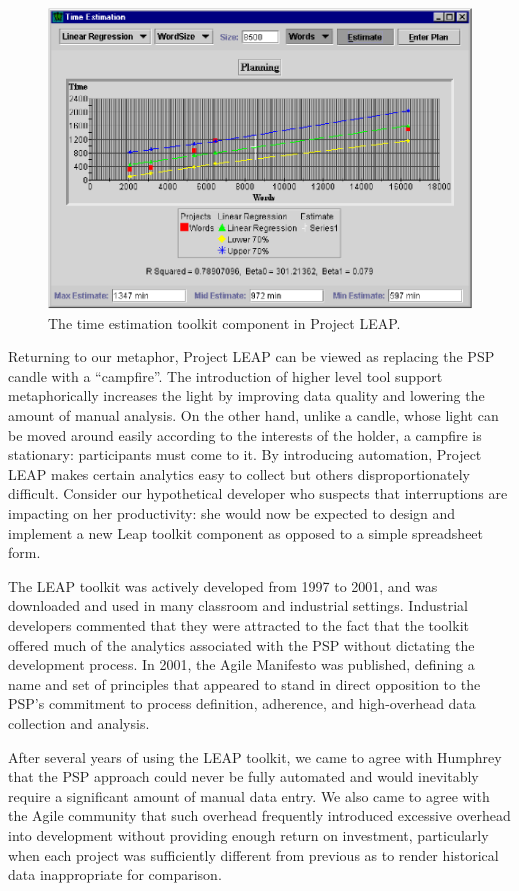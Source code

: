 \documentclass[]{article}
\begin{document}
\begin{figure}[!tb]
\centering
\includegraphics[width=0.50\columnwidth]{planword.eps}
\caption{The time estimation toolkit component in Project LEAP.}
\label{fig:leap}
\end{figure}

Returning to our metaphor, Project LEAP can be viewed as replacing the PSP candle with a
``campfire''.  The introduction of higher level tool support metaphorically increases the
light by improving data quality and lowering the amount of manual analysis.  On the other
hand, unlike a candle, whose light can be moved around easily according to the interests
of the holder, a campfire is stationary: participants must come to it.  By introducing
automation, Project LEAP makes certain analytics easy to collect but others
disproportionately difficult.  Consider our hypothetical developer who suspects that
interruptions are impacting on her productivity: she would now be expected to design and
implement a new Leap toolkit component as opposed to a simple spreadsheet form. 

The LEAP toolkit was actively developed from 1997 to 2001, and was downloaded and used in
many classroom and industrial settings.  Industrial developers commented that they were
attracted to the fact that the toolkit offered much of the analytics associated with the
PSP without dictating the development process.  In 2001, the Agile Manifesto
\cite{AgileManifesto} was published, defining a name and set of principles that appeared
to stand in direct opposition to the PSP's commitment to process definition, adherence,
and high-overhead data collection and analysis.

After several years of using the LEAP toolkit, we came to agree with Humphrey that the PSP
approach could never be fully automated and would inevitably require a significant amount
of manual data entry.  We also came to agree with the Agile community that such overhead
frequently introduced excessive overhead into development without providing enough return
on investment, particularly when each project was sufficiently different from previous as
to render historical data inappropriate for comparison.
\end{document}
